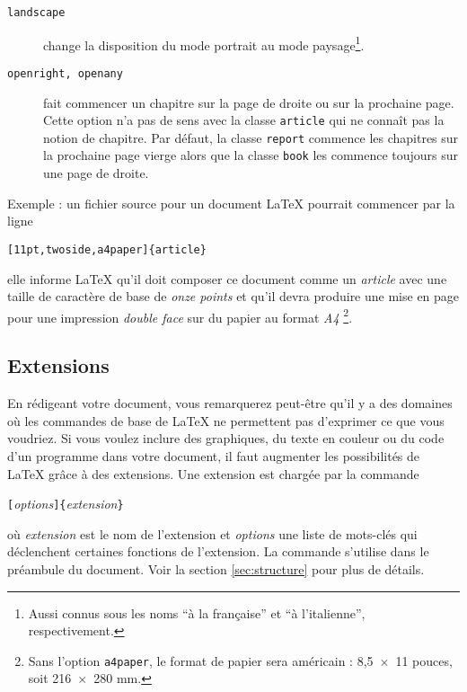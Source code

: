 \begin{table}[!bp]
\begin{lined}{\textwidth}
\begin{flushleft}
\begin{description}
\item[\normalfont\texttt{landscape}] \quad change la disposition du
  mode portrait au mode paysage\footnote{Aussi connus sous les noms
    \enquote{à la française} et \enquote{à l'italienne}, respectivement. \NdT}.

\item[\normalfont\texttt{openright, openany}] \quad fait commencer un
chapitre sur la page de droite ou sur la prochaine page. Cette option
n'a pas de sens avec la classe \texttt{article} qui ne connaît pas la
notion de chapitre. Par défaut, la classe \texttt{report} commence les
chapitres sur la prochaine page vierge alors que la classe
\texttt{book} les commence toujours sur une page de droite.

\end{description}
\end{flushleft}
\end{lined}
\end{table}

Exemple : un fichier source pour un document \LaTeX{} pourrait
commencer par la ligne
\begin{code}
\verb|[11pt,twoside,a4paper]{article}|
\end{code}
elle informe \LaTeX{} qu'il doit composer ce document comme un
\emph{article} avec une taille de caractère de base de \emph{onze
points} et qu'il devra produire une mise en page pour une impression
\emph{double face} sur du papier au format \emph{A4}%
\footnote{Sans l'option \texttt{a4paper}, le format de papier sera
américain : 8,5~$\times$~11 pouces, soit 216~$\times$~280 mm.}.
\pagebreak[2]

\subsection{Extensions}
En rédigeant votre document, vous remarquerez peut-être qu'il y a des
domaines où les commandes de base de \LaTeX{} ne permettent pas
d'exprimer ce que vous voudriez. Si vous voulez inclure des
graphiques, du texte en couleur ou du code d'un programme dans votre
document, il faut augmenter les possibilités de \LaTeX{} grâce à des
extensions.
Une extension est chargée par la commande
\begin{lscommand}
\verb|[|\emph{options}\verb|]{|\emph{extension}\verb|}|
\end{lscommand}
où \emph{extension} est le nom de l'extension et \emph{options} une liste
de mots-clés qui déclenchent certaines fonctions de
l'extension. La commande  s'utilise dans le préambule
du document. Voir la section \ref{sec:structure} pour plus de détails.


